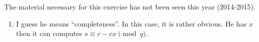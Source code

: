 \newape

\begin{solution}
  The material necessary for this exercise has not been seen this year (2014-2015).
\end{solution}

\begin{solution}
  \begin{enumerate}
    \item I guess he means ``completeness''.
      In this case, it is rather obvious.
      He has $x$ then it can computes $s \equiv r - cx \pmod{q}$.
  \end{enumerate}
\end{solution}
